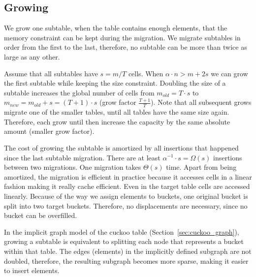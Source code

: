 \documentclass[a4paper,UKenglish]{lipics-v2016}
\begin{document}

\subsection{Growing}
We grow one subtable,
when the table contains enough elements, that the memory constraint
can be kept during the migration.  We migrate subtables in order
from the first to the last, therefore, no subtable can be more than
twice as large as any other.

Assume that all subtables have $s=m/T$ cells. When $\alpha\cdot n >
m+2s$ we can grow the first subtable while keeping the size
constraint.  Doubling the size of a subtable increases the global
number of cells from $m_{old} = T\cdot s$ to $m_{new} = m_{old}+s =
(T+1)\cdot s$ (grow factor $\frac{T+1}{T}$).  Note that all subsequent
grows migrate one of the smaller tables, until all tables have the
same size again.  Therefore, each grow until then increase the
capacity by the same absolute amount (smaller grow factor).

The cost of growing the subtable is amortized by all insertions that
happened since the last subtable migration.  There are at least
$\alpha^{-1} \cdot s = \Omega(s)$ insertions between two migrations.
One migration takes $\Theta(s)$ time.  Apart from being amortized,
the migration is efficient in practice because it accesses cells in a
linear fashion making it really cache efficient.  Even in the target
table cells are accessed linearly.  Because of the way we assign
elements to buckets, one original bucket is split into two target
buckets.  Therefore, no displacements are necessary, since no bucket
can be overfilled.

In the implicit graph model of the cuckoo table
(Section~\ref{sec:cuckoo_graph}), growing a subtable is equivalent to
splitting each node that represents a bucket within that table. The
edges (elements) in the implicitly defined subgraph are not doubled,
therefore, the resulting subgraph becomes more sparse, making it
easier to insert elements.
\end{document}
